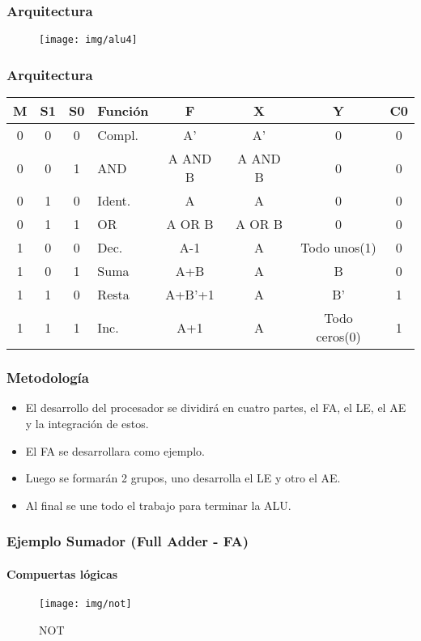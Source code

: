 \documentclass{beamer}
\begin{document}
\begin{frame}
  \frametitle{Arquitectura}
  \begin{figure}
    \texttt{[image: img/alu4]}
  \end{figure}
\end{frame}

\begin{frame}
  \frametitle{Arquitectura}
  \begin{table}
    \begin{tabular}{|c c c|l c c c c|}
      \hline
      M&S1&S0&Función&F&X&Y&C0\\
      \hline
       0&0&0&\small{Compl.}&A'&A'&0&0\\
       0&0&1&AND&A AND B&A AND B&0&0\\
       0&1&0&Ident.&A&A&0&0\\
       0&1&1&OR&A OR B&A OR B&0&0\\
       1&0&0&Dec.&A-1&A&Todo unos(1)&0\\
       1&0&1&Suma&A+B&A&B&0\\
       1&1&0&Resta&A+B'+1&A&B'&1\\
       1&1&1&Inc.&A+1&A&Todo ceros(0)&1\\
      \hline
    \end{tabular}
  \end{table}
\end{frame}

\begin{frame}
  \frametitle{Metodología}
  \begin{itemize}
  \item El desarrollo del procesador se dividirá en cuatro partes, el FA, el LE, el AE y la integración de estos.
  \item El FA se desarrollara como ejemplo.
  \item Luego se formarán 2 grupos, uno desarrolla el LE y otro el AE.
  \item Al final se une todo el trabajo para terminar la ALU.
  \end{itemize}
\end{frame}

\begin{frame}
  \frametitle{Ejemplo Sumador (Full Adder - FA)}
  \framesubtitle{Compuertas lógicas}
  \begin{figure}
    \texttt{[image: img/not]}
    \caption{NOT}
  \end{figure}
\end{frame}
\end{document}
